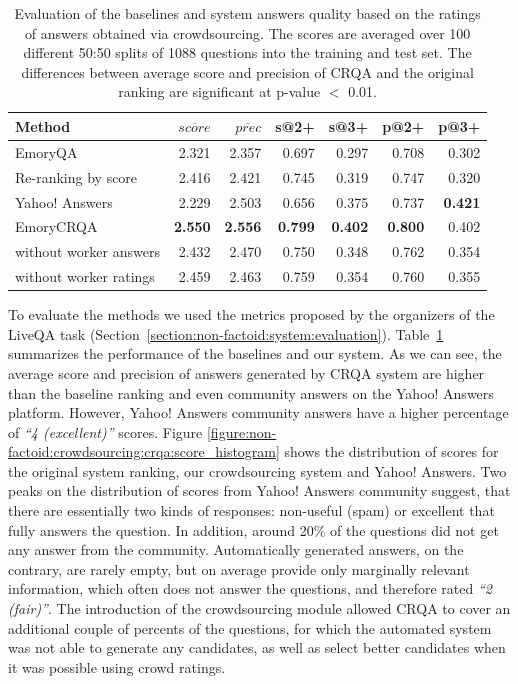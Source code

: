 \begin{table}[h]
\centering
\small
\begin{tabular}{p{4.2cm}|rrrrrr}
Method & $\overline{score}$ & $\overline{prec}$ & s@2+ & s@3+ & p@2+ & p@3+ \\
\hline
EmoryQA & 2.321 & 2.357 & 0.697 & 0.297 &  0.708 & 0.302 \\
Re-ranking by score & 2.416 & 2.421 & 0.745 & 0.319 & 0.747 & 0.320  \\
Yahoo! Answers & 2.229 & 2.503 & 0.656 & 0.375 & 0.737 & \textbf{0.421} \\
EmoryCRQA & \textbf{2.550} & \textbf{2.556} & \textbf{0.799} & \textbf{0.402} & \textbf{0.800} & 0.402 \\
\hspace{3mm}without worker answers & 2.432 & 2.470 & 0.750 & 0.348 & 0.762 & 0.354 \\
\hspace{3mm}without worker ratings & 2.459 & 2.463 & 0.759 & 0.354 & 0.760 & 0.355 \\
\end{tabular}
\caption{Evaluation of the baselines and system answers quality based on the ratings of answers obtained via crowdsourcing. The scores are averaged over 100 different 50:50 splits of 1088 questions into the training and test set. The differences between average score and precision of CRQA and the original ranking are significant at p-value $<$ 0.01.}
\label{table:non-factoid:crowdsourcing:crqa:performance}
\end{table}

To evaluate the methods we used the metrics proposed by the organizers of the LiveQA task (Section~\ref{section:non-factoid:system:evaluation}).
Table~\ref{table:non-factoid:crowdsourcing:crqa:performance} summarizes the performance of the baselines and our system.
As we can see, the average score and precision of answers generated by CRQA system are higher than the baseline ranking and even community answers on the Yahoo! Answers platform.
However, Yahoo! Answers community answers have a higher percentage of \textit{``4 (excellent)''} scores.
Figure \ref{figure:non-factoid:crowdsourcing:crqa:score_histogram} shows the distribution of scores for the original system ranking, our crowdsourcing system and Yahoo! Answers.
Two peaks on the distribution of scores from Yahoo! Answers community suggest, that there are essentially two kinds of responses: non-useful (\eg spam) or excellent that fully answers the question.
In addition, around 20\% of the questions did not get any answer from the community.
Automatically generated answers, on the contrary, are rarely empty, but on average provide only marginally relevant information, which often does not answer the questions, and therefore rated \textit{``2 (fair)''}.
The introduction of the crowdsourcing module allowed CRQA to cover an additional couple of percents of the questions, for which the automated system was not able to generate any candidates, as well as select better candidates when it was possible using crowd ratings.

